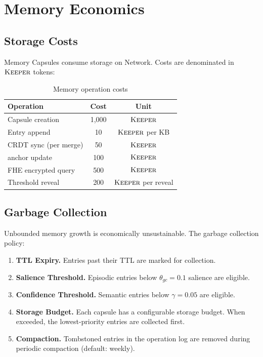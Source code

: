 \section{Memory Economics}

\label{sec:economics}

\subsection{Storage Costs}

Memory Capsules consume storage on \Zoo{} Network. Costs are denominated in $\textsc{Keeper}$ tokens:

\begin{table}[h]
\centering
\begin{tabular}{lcc}
\toprule
\textbf{Operation} & \textbf{Cost} & \textbf{Unit} \\
\midrule
Capsule creation & 1,000 & $\textsc{Keeper}$ \\
Entry append & 10 & $\textsc{Keeper}$ per KB \\
CRDT sync (per merge) & 50 & $\textsc{Keeper}$ \\
\IChain{} anchor update & 100 & $\textsc{Keeper}$ \\
FHE encrypted query & 500 & $\textsc{Keeper}$ \\
Threshold reveal & 200 & $\textsc{Keeper}$ per reveal \\
\bottomrule
\end{tabular}
\caption{Memory operation costs}
\label{tab:costs}
\end{table}

\subsection{Garbage Collection}

Unbounded memory growth is economically unsustainable. The garbage collection policy:

\begin{enumerate}
    \item \textbf{TTL Expiry.} Entries past their TTL are marked for collection.
    \item \textbf{Salience Threshold.} Episodic entries below $\theta_{\textit{gc}} = 0.1$ salience are eligible.
    \item \textbf{Confidence Threshold.} Semantic entries below $\gamma = 0.05$ are eligible.
    \item \textbf{Storage Budget.} Each capsule has a configurable storage budget. When exceeded, the lowest-priority entries are collected first.
    \item \textbf{Compaction.} Tombstoned entries in the operation log are removed during periodic compaction (default: weekly).
\end{enumerate}

